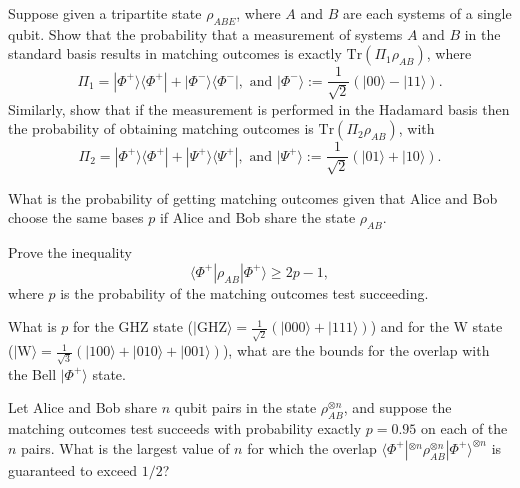 \documentclass[a4paper,10pt,landscape,twocolumn]{scrartcl}
\newcommand{\ket}[1]{| #1 \rangle}
\newcommand{\bra}[1]{\langle #1 |}
\newcommand{\proj}[1]{| #1 \rangle \langle #1 |}
\newcommand{\Tr}{\text{Tr}}
\begin{document}
\begin{exercise}
\begin{subex}[Exercise 6.2.2]
Suppose given a tripartite state $\rho_{ABE}$, where $A$ and $B$ are each systems of a
single qubit. Show that the probability that a measurement of systems $A$ and $B$ in the standard
basis results in matching outcomes is exactly $\Tr\left( \Pi_1 \rho_{AB}\right)$, where
\begin{equation}
\Pi_1=\proj{\Phi^+}+\proj{\Phi^-}, \text{ and } \ket{\Phi^-}:=\frac{1}{\sqrt{2}}(\ket{00}-\ket{11}).
\end{equation}
Similarly, show that if the measurement is performed in the Hadamard basis then the probability
of obtaining matching outcomes is $\Tr\left( \Pi_2 \rho_{AB}\right)$, with
\begin{equation}
\Pi_2=\proj{\Phi^+}+\proj{\Psi^+}, \text{ and } \ket{\Psi^+}:=\frac{1}{\sqrt{2}}(\ket{01}+\ket{10}).
\end{equation}
\end{subex}

\begin{subex}
What is the probability of getting matching outcomes given that Alice and Bob choose the same bases $p$ if Alice and Bob share the state $\rho_{AB}$.
\end{subex}

\begin{subex}[Equation (6.6)]
Prove the inequality 
\begin{equation}
\bra{\Phi^+}\rho_{AB}\ket{\Phi^+}\geq 2p-1,
\end{equation}
where $p$ is the probability of the matching outcomes test succeeding.
\end{subex}

\begin{subex}[Examples]
What is $p$ for the GHZ state ($\ket{\text{GHZ}}=\frac{1}{\sqrt{2}}(\ket{000}+\ket{111})$) and for the W state ($\ket{\text{W}}=\frac{1}{\sqrt{3}}(\ket{100}+\ket{010}+\ket{001})$), what are the bounds for the overlap with the Bell $\ket{\Phi^+}$ state.
\end{subex}

\begin{subex}
Let Alice and Bob share $n$ qubit pairs in the state $\rho _{AB}^{\otimes n}$, and suppose the matching outcomes test succeeds with probability exactly $p=0.95$ on each of the $n$ pairs. What is the largest value of $n$ for which the overlap $\langle \Phi^+|^{\otimes n}\rho _{AB}^{\otimes n}|\Phi^+\rangle ^{\otimes n}$ is guaranteed to exceed $1/2$? 
\end{subex}
\end{exercise}
\end{document}
